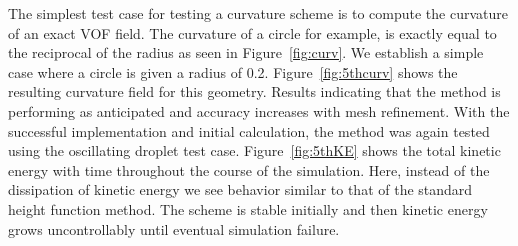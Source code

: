  The simplest test case for testing a curvature scheme is to compute the curvature of an exact VOF field. The curvature of a circle for example, is exactly equal to the reciprocal of the radius as seen in Figure~\ref{fig:curv}. We establish a simple case where a circle is given a radius of 0.2. Figure~\ref{fig:5thcurv} shows the resulting curvature field for this geometry. Results indicating that the method is performing as anticipated and accuracy increases with mesh refinement. With the successful implementation and initial calculation, the method was again tested using the oscillating droplet test case. Figure~\ref{fig:5thKE} shows the total kinetic energy with time throughout the course of the simulation. Here, instead of the dissipation of kinetic energy we see behavior similar to that of the standard height function method. The scheme is stable initially and then kinetic energy grows uncontrollably until eventual simulation failure.
